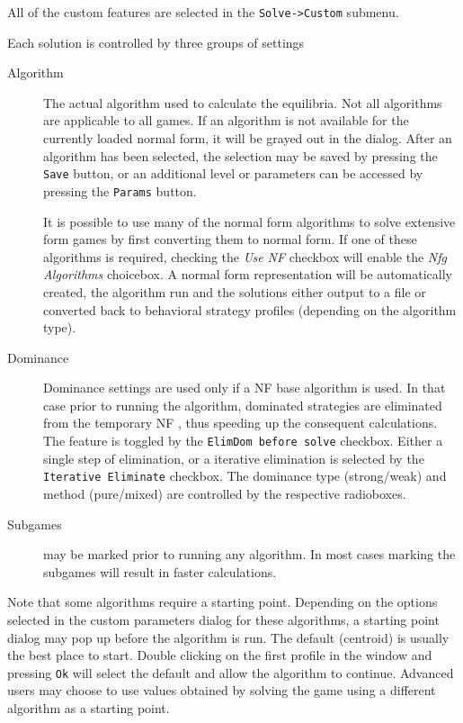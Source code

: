 All of the custom features are selected in the {\tt Solve->Custom} submenu.  

Each solution is controlled by three groups of settings

\begin{description}
\item[Algorithm] The actual algorithm used to calculate the equilibria.  Not all algorithms
are applicable to all games.  If an algorithm is not available for the
currently loaded normal form, it will be grayed out in the dialog.  After an
algorithm has been selected, the selection may be saved by pressing 
the {\tt Save} button, or an additional level or parameters can be accessed by
pressing the {\tt Params} button.

It is possible to use many of the normal form algorithms to solve
extensive form games by first converting them to normal form.  If one of
these algorithms is required, checking the {\em Use NF} checkbox will
enable the {\em Nfg Algorithms} choicebox.  A normal form representation
will be automatically created, the algorithm run and the solutions either
output to a file or converted back to behavioral strategy profiles
(depending on the algorithm type).
\item[Dominance] Dominance settings are used only if a NF base algorithm is
used.  In that case prior to running the algorithm, 
dominated strategies are eliminated from the temporary NF , thus
speeding up the consequent calculations.  The feature is toggled by 
the {\tt ElimDom before solve} checkbox.  Either a single step of elimination,
or a iterative elimination is selected by the {\tt Iterative Eliminate} 
checkbox.  The dominance type (strong/weak) and method (pure/mixed) are controlled
by the respective radioboxes.
\item[Subgames]  may be marked prior to running
any algorithm.  In most cases marking the subgames will result in faster 
calculations.
\end{description}

Note that some algorithms require a starting point.  Depending on the
options selected in the custom parameters dialog for these algorithms,
a starting point dialog may pop up before the algorithm is run.  The
default (centroid) is usually the best place to start.  Double clicking on
the first profile in the window and pressing {\tt Ok} will select the
default and allow the algorithm to continue.  Advanced users may choose to
use values obtained by solving the game using a different algorithm as a
starting point.

